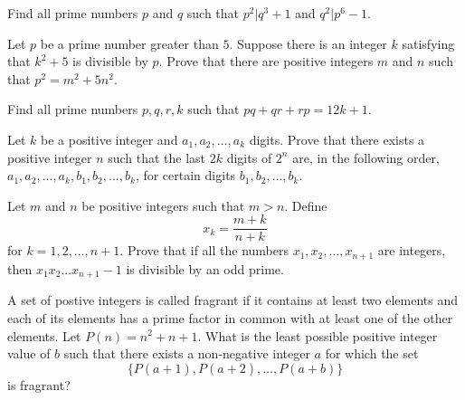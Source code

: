 \documentclass[problems.tex]{subfile}
\begin{document}
	
	
	\begin{problem}
		Find all prime numbers $p$ and $q$ such that $p^2|q^3+1$ and $q^2|p^6-1$. %
	\end{problem}
	
	
	
	
	\begin{problem}
		Let $p$ be a prime number greater than $5$. Suppose there is an integer $k$ satisfying that $k^2+5$ is divisible by $p$. Prove that there are positive integers $m$ and $n$ such that $p^2=m^2+5n^2$. %
	\end{problem}
	
	
	
	
	\begin{problem}[IberoAmerican 2016]
		Find all prime numbers $p,q,r,k$ such that $pq+qr+rp = 12k+1$. %
	\end{problem}
	
	
	
	
	\begin{problem}[IberoAmerican 2016]
		Let $k$ be a positive integer and $a_1, a_2,\dots, a_k$ digits. Prove that there exists a positive integer $n$ such that the last $2k$ digits of $2^n$ are, in the following order, $a_1, a_2,\dots, a_k , b_1, b_2, \dots, b_k$, for certain digits $b_1, b_2, \dots, b_k$. %
	\end{problem}
	
	
	
	\begin{problem}
		Let $m$ and $n$ be positive integers such that $m>n$. Define $$x_k=\frac{m+k}{n+k}$$ for $k=1,2,\ldots,n+1$. Prove that if all the numbers $x_1,x_2,\ldots,x_{n+1}$ are integers, then $x_1x_2\ldots x_{n+1}-1$ is divisible by an odd prime. %
	\end{problem}
	
	
	\begin{problem}[IMO 2016]
		A set of postive integers is called fragrant if it contains at least two elements and each of its elements has a prime factor in common with at least one of the other elements. Let $P(n)=n^2+n+1$. What is the least possible positive integer value of $b$ such that there exists a non-negative integer $a$ for which the set $$\{P(a+1),P(a+2),\ldots,P(a+b)\}$$is fragrant? %
	\end{problem}
	
\end{document}
